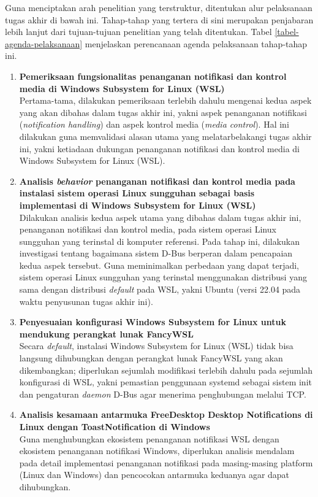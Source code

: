Guna menciptakan arah penelitian yang terstruktur, ditentukan alur pelaksanaan tugas akhir di bawah ini. Tahap-tahap yang tertera di sini merupakan penjabaran lebih lanjut dari tujuan-tujuan penelitian yang telah ditentukan. Tabel \ref{tabel-agenda-pelaksanaan} menjelaskan perencanaan agenda pelaksanaan tahap-tahap ini.
\begin{enumerate}
    \item \textbf{Pemeriksaan fungsionalitas penanganan notifikasi dan kontrol media di Windows Subsystem for Linux (WSL)}\\
    Pertama-tama, dilakukan pemeriksaan terlebih dahulu mengenai kedua aspek yang akan dibahas dalam tugas akhir ini, yakni aspek penanganan notifikasi (\textit{notification handling}) dan aspek kontrol media (\textit{media control}). Hal ini dilakukan guna memvalidasi alasan utama yang melatarbelakangi tugas akhir ini, yakni ketiadaan dukungan penanganan notifikasi dan kontrol media di Windows Subsystem for Linux (WSL).

    \item \textbf{Analisis \textit{behavior} penanganan notifikasi dan kontrol media pada instalasi sistem operasi Linux sungguhan sebagai basis implementasi di Windows Subsystem for Linux (WSL)}\\
    Dilakukan analisis kedua aspek utama yang dibahas dalam tugas akhir ini, penanganan notifikasi dan kontrol media, pada sistem operasi Linux sungguhan yang terinstal di komputer referensi. Pada tahap ini, dilakukan investigasi tentang bagaimana sistem D-Bus berperan dalam pencapaian kedua aspek tersebut. Guna meminimalkan perbedaan yang dapat terjadi, sistem operasi Linux sungguhan yang terinstal menggunakan distribusi yang sama dengan distribusi \textit{default} pada WSL, yakni Ubuntu (versi 22.04 pada waktu penyusunan tugas akhir ini).

    \item \textbf{Penyesuaian konfigurasi Windows Subsystem for Linux untuk mendukung perangkat lunak FancyWSL}\\
    Secara \textit{default}, instalasi Windows Subsystem for Linux (WSL) tidak bisa langsung dihubungkan dengan perangkat lunak FancyWSL yang akan dikembangkan; diperlukan sejumlah modifikasi terlebih dahulu pada sejumlah konfigurasi di WSL, yakni pemastian penggunaan systemd sebagai sistem init dan pengaturan \textit{daemon} D-Bus agar menerima penghubungan melalui TCP.

    \item \textbf{Analisis kesamaan antarmuka FreeDesktop Desktop Notifications di Linux dengan ToastNotification di Windows}\\
    Guna menghubungkan ekosistem penanganan notifikasi WSL dengan ekosistem penanganan notifikasi Windows, diperlukan analisis mendalam pada detail implementasi penanganan notifikasi pada masing-masing platform (Linux dan Windows) dan pencocokan antarmuka keduanya agar dapat dihubungkan.


\end{enumerate}
